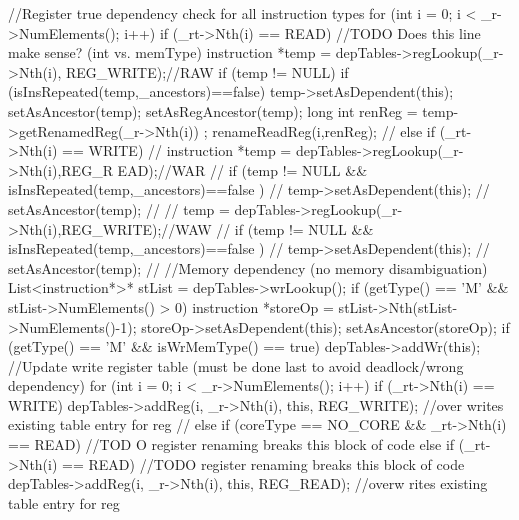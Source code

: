 \begin{DoxyCode}
                                                                  {
        //Register true dependency check for all instruction types
        for (int i = 0; i < _r->NumElements(); i++) {
                if (_rt->Nth(i) == READ) { //TODO Does this line make sense? (int
       vs. memType)
                        instruction *temp = depTables->regLookup(_r->Nth(i),
      REG_WRITE);//RAW
                        if (temp != NULL) {
                                if (isInsRepeated(temp,_ancestors)==false) {
                                        temp->setAsDependent(this);
                                        setAsAncestor(temp);
                                        setAsRegAncestor(temp);
                                }
                                long int renReg = temp->getRenamedReg(_r->Nth(i))
      ;
                                renameReadReg(i,renReg);
                        }
                // } else if (_rt->Nth(i) == WRITE) {
                //      instruction *temp = depTables->regLookup(_r->Nth(i),REG_R
      EAD);//WAR
                //      if (temp != NULL && isInsRepeated(temp,_ancestors)==false
      ) {
                //              temp->setAsDependent(this);
                //              setAsAncestor(temp);
                //      }
                //      temp = depTables->regLookup(_r->Nth(i),REG_WRITE);//WAW
                //      if (temp != NULL && isInsRepeated(temp,_ancestors)==false
      ) {
                //              temp->setAsDependent(this);
                //              setAsAncestor(temp);
                //      }
                }
        }
        //Memory dependency (no memory disambiguation)
        List<instruction*>* stList = depTables->wrLookup();
        if (getType() == 'M' && stList->NumElements() > 0) {
                instruction *storeOp = stList->Nth(stList->NumElements()-1);
                storeOp->setAsDependent(this);
                setAsAncestor(storeOp);
        }
        if (getType() == 'M' && isWrMemType() == true) {
                depTables->addWr(this);
        }
        //Update write register table (must be done last to avoid deadlock/wrong 
      dependency)
        for (int i = 0; i < _r->NumElements(); i++) {
                if (_rt->Nth(i) == WRITE) {
                        depTables->addReg(i, _r->Nth(i), this, REG_WRITE); //over
      writes existing table entry for reg
                // } else if (coreType == NO_CORE && _rt->Nth(i) == READ) { //TOD
      O register renaming breaks this block of code
                } else if (_rt->Nth(i) == READ) { //TODO register renaming breaks
       this block of code
                        depTables->addReg(i, _r->Nth(i), this, REG_READ); //overw
      rites existing table entry for reg
                }
        }
}
\end{DoxyCode}


